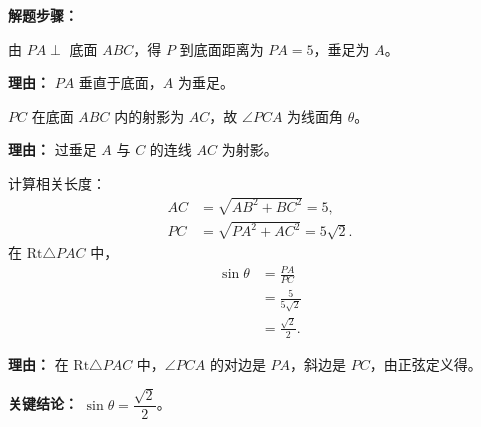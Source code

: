 \begin{examplebox}
	\textbf{\textcolor{CExample}{解题步骤：}}
	\begin{description}[style=nextline, leftmargin=2.8em, labelsep=0.5em, itemsep=0.45em]
		\item[\textbf{第一步（作垂线）：}] 由 $PA \perp$ 底面 $ABC$，得 $P$ 到底面距离为 $PA=5$，垂足为 $A$。
			\par\textbf{理由：} $PA$ 垂直于底面，$A$ 为垂足。
		\item[\textbf{第二步（确定射影）：}] $PC$ 在底面 $ABC$ 内的射影为 $AC$，故 $\angle PCA$ 为线面角 $\theta$。
			\par\textbf{理由：} 过垂足 $A$ 与 $C$ 的连线 $AC$ 为射影。
		\item[\textbf{第三步（计算正弦）：}]
			计算相关长度：
			\[
				\begin{aligned}
					AC &= \sqrt{AB^2+BC^2}=5,\\
					PC &= \sqrt{PA^2+AC^2}=5\sqrt{2}.
			\end{aligned}
			\]
			在 $\mathrm{Rt}\triangle PAC$ 中，
			\[
				\begin{aligned}
					\sin\theta &= \frac{PA}{PC} \\
					&= \frac{5}{5\sqrt{2}} \\
					&= \frac{\sqrt{2}}{2}.
			\end{aligned}
			\]
			\par\textbf{理由：} 在 $\mathrm{Rt}\triangle PAC$ 中，$\angle PCA$ 的对边是 $PA$，斜边是 $PC$，由正弦定义得。
	\end{description}

	\textbf{\textcolor{CExample}{关键结论：}}
	\textbf{$\sin\theta = \dfrac{\sqrt{2}}{2}$}。
\end{examplebox}
